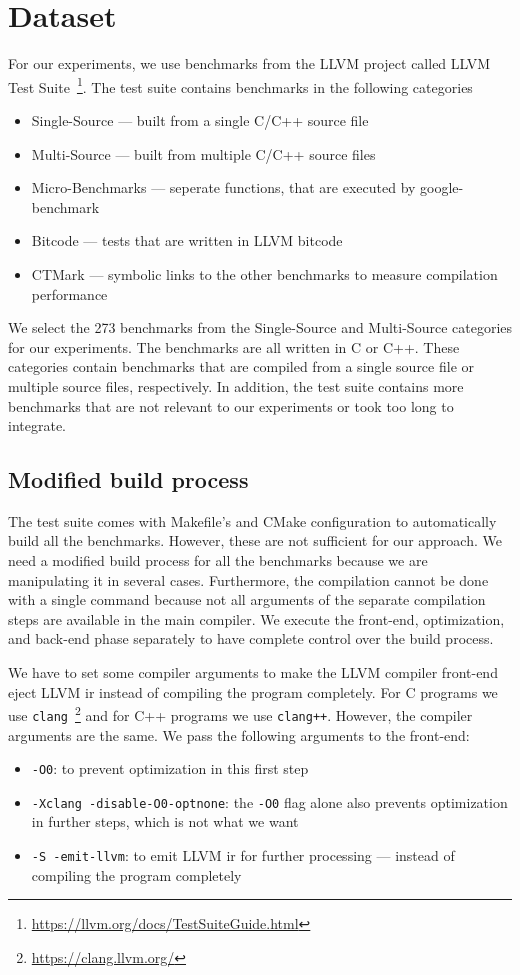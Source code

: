 \section{Dataset}
\label{sec:approach:dataset}
For our experiments, we use benchmarks from the LLVM project called LLVM Test Suite~\footnote{\url{https://llvm.org/docs/TestSuiteGuide.html}}.
The test suite contains benchmarks in the following categories
\begin{itemize}
    \item Single-Source --- built from a single C/C++ source file
    \item Multi-Source --- built from multiple C/C++ source files
    \item Micro-Benchmarks --- seperate functions, that are executed by google-benchmark
    \item Bitcode --- tests that are written in LLVM bitcode
    \item CTMark --- symbolic links to the other benchmarks to measure compilation performance
\end{itemize}
We select the 273 benchmarks from the Single-Source and Multi-Source categories for our experiments.
The benchmarks are all written in C or C++.
These categories contain benchmarks that are compiled from a single source file or multiple source files, respectively.
In addition, the test suite contains more benchmarks that are not relevant to our experiments or took too long to integrate.

\subsection{Modified build process}
\label{sec:approach:build_process}
The test suite comes with Makefile's and CMake configuration to automatically build all the benchmarks.
However, these are not sufficient for our approach.
We need a modified build process for all the benchmarks because we are manipulating it in several cases.
Furthermore, the compilation cannot be done with a single command because not all arguments of the separate compilation steps are available in the main compiler.
We execute the front-end, optimization, and back-end phase separately to have complete control over the build process.

We have to set some compiler arguments to make the LLVM compiler front-end eject LLVM \ac{ir} instead of compiling the program completely.
For C programs we use \lstinline{clang}~\footnote{\url{https://clang.llvm.org/}} and for C++ programs we use \lstinline{clang++}.
However, the compiler arguments are the same.
We pass the following arguments to the front-end:
\begin{itemize}
    \item \lstinline{-O0}: to prevent optimization in this first step
    \item \lstinline{-Xclang -disable-O0-optnone}: the \lstinline{-O0} flag alone also prevents optimization in further steps, which is not what we want
    \item \lstinline{-S -emit-llvm}: to emit LLVM \ac{ir} for further processing --- instead of compiling the program completely
\end{itemize}

